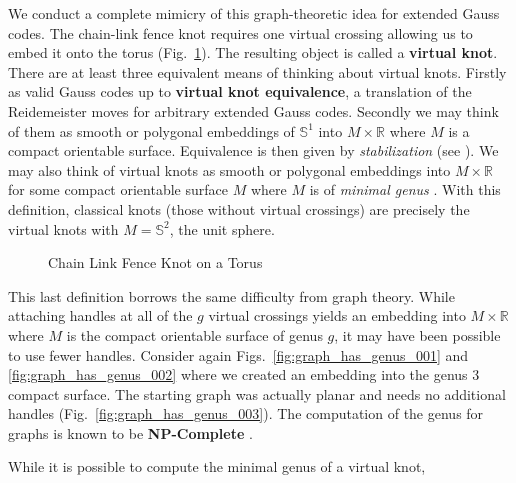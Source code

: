 \documentclass{article}
\theoremstyle{plain}
\begin{document}
        We conduct a complete mimicry of this graph-theoretic idea for
        extended Gauss codes. The chain-link fence knot requires one
        virtual crossing allowing us to embed it onto the torus
        (Fig.~\ref{fig:chain_link_fence_knot_on_torus}). The resulting object
        is called a \textbf{virtual knot}. There are at least three equivalent
        means of thinking about virtual knots. Firstly as valid Gauss codes
        up to \textbf{virtual knot equivalence}, a translation of the
        Reidemeister moves for arbitrary extended Gauss codes. Secondly we may
        think of them as smooth or polygonal embeddings of $\mathbb{S}^{1}$ into
        $M\times\mathbb{R}$ where $M$ is a compact orientable surface.
        Equivalence is then given by \textit{stabilization}
        (see \cite{CarterKamadaSaitoVirtualKnotCobordisms}). We may also think
        of virtual knots as smooth or polygonal embeddings into
        $M\times\mathbb{R}$ for some compact orientable surface $M$ where $M$
        is of \textit{minimal genus} \cite{KuperbergVirtualLink}.
        With this definition, classical knots (those without virtual crossings)
        are precisely the virtual knots with $M=\mathbb{S}^{2}$,
        the unit sphere.
        \begin{figure}
            \centering
            \caption{Chain Link Fence Knot on a Torus}
            \label{fig:chain_link_fence_knot_on_torus}
        \end{figure}
        \par\hfill\par
        This last definition borrows the same difficulty from graph theory.
        While attaching handles at all of the $g$ virtual crossings yields an
        embedding into $M\times\mathbb{R}$ where $M$ is the compact orientable
        surface of genus $g$, it may have been possible to use fewer handles.
        Consider again Figs.~\ref{fig:graph_has_genus_001} and
        \ref{fig:graph_has_genus_002} where we created an embedding into the
        genus 3 compact surface. The starting graph was actually planar and
        needs no additional handles (Fig.~\ref{fig:graph_has_genus_003}).
        The computation of the genus for graphs is known to be
        \textbf{NP-Complete} \cite{GareyJohnsonGraphCrossingNumberNPComplete}.
        \par\hfill\par
        While it is possible to compute the minimal genus of a virtual knot,
\end{document}
